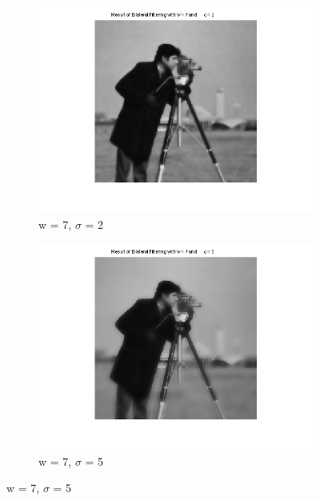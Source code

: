 \documentclass[12pt]{article}
\begin{document}
\begin{figure}[ht!]
        \begin{subfigure}[b]{0.45\textwidth}
                \includegraphics[width=\textwidth]{w7s2.png}
                \caption{w = 7, $\sigma$ = 2}
        \end{subfigure}%
        \begin{subfigure}[b]{0.45\textwidth}
                \includegraphics[width=\textwidth]{w7s5.png}
                \caption{w = 7, $\sigma$ = 5}
        \end{subfigure}
        

\end{figure}
\end{document}
